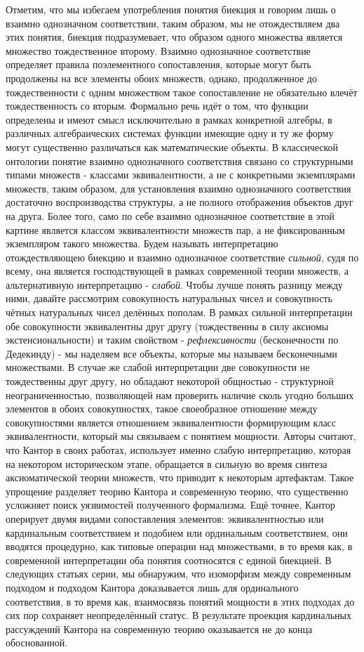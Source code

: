 \documentclass[12pt]{article}
\begin{document}
Отметим, что мы избегаем употребления понятия биекция и говорим лишь о взаимно однозначном соответствии, таким образом, мы не отождествляем два этих понятия, биекция подразумевает, что образом одного множества является множество тождественное второму. Взаимно однозначное соответствие определяет правила поэлементного сопоставления, которые могут быть продолжены на все элементы обоих множеств, однако, продолженное до тождественности с одним множеством такое сопоставление не обязательно влечёт тождественность со вторым. Формально речь идёт о том, что функции определены и имеют смысл исключительно в рамках конкретной алгебры, в различных алгебраических системах функции имеющие одну и ту же форму могут существенно различаться как математические объекты. В классической онтологии понятие взаимно однозначного соответствия связано со структурными типами множеств - классами эквивалентности, а не с конкретными экземплярами множеств, таким образом, для установления взаимно однозначного соответствия достаточно воспроизводства структуры, а не полного отображения объектов друг на друга. Более того, само по себе взаимно однозначное соответствие в этой картине является классом эквивалентности множеств пар, а не фиксированным экземпляром такого множества. Будем называть интерпретацию отождествляющею биекцию и взаимно однозначное соответствие {\it сильной}, судя по всему, она является господствующей в рамках современной теории множеств, а альтернативную интерпретацию - {\it слабой}. Чтобы лучше понять разницу между ними, давайте рассмотрим совокупность натуральных чисел и совокупность чётных натуральных чисел делённых пополам. В рамках сильной интерпретации обе совокупности эквивалентны друг другу (тождественны в силу аксиомы экстенсиональности) и таким свойством - {\it рефлексивности} (бесконечности по Дедекинду) - мы наделяем все объекты, которые мы называем бесконечными множествами. В случае же слабой интерпретации две совокупности не тождественны друг другу, но обладают некоторой общностью - структурной неограниченностью, позволяющей нам проверить наличие сколь угодно больших элементов в обоих совокупностях, такое своеобразное отношение между совокупностями является отношением эквивалентности формирующим класс эквивалентности, который мы связываем с понятием мощности. Авторы считают, что Кантор в своих работах, использует именно слабую интерпретацию, которая на некотором историческом этапе, обращается в сильную во время синтеза аксиоматической теории множеств, что приводит к некоторым артефактам. Такое упрощение разделяет теорию Кантора и современную теорию, что существенно усложняет поиск уязвимостей полученного формализма. Ещё точнее, Кантор оперирует двумя видами сопоставления элементов: эквивалентностью или кардинальным соответствием и подобием или ординальным соответствием, они вводятся процедурно, как типовые операции над множествами, в то время как, в современной интерпретации оба понятия соотносятся с единой биекцией. В следующих статьях серии, мы обнаружим, что изоморфизм между современным подходом и подходом Кантора доказывается лишь для ординального соответствия, в то время как, взаимосвязь понятий мощности в этих подходах до сих пор сохраняет неопределённый статус. В результате проекция кардинальных рассуждений Кантора на современную теорию оказывается не до конца обоснованной. 
\end{document}
